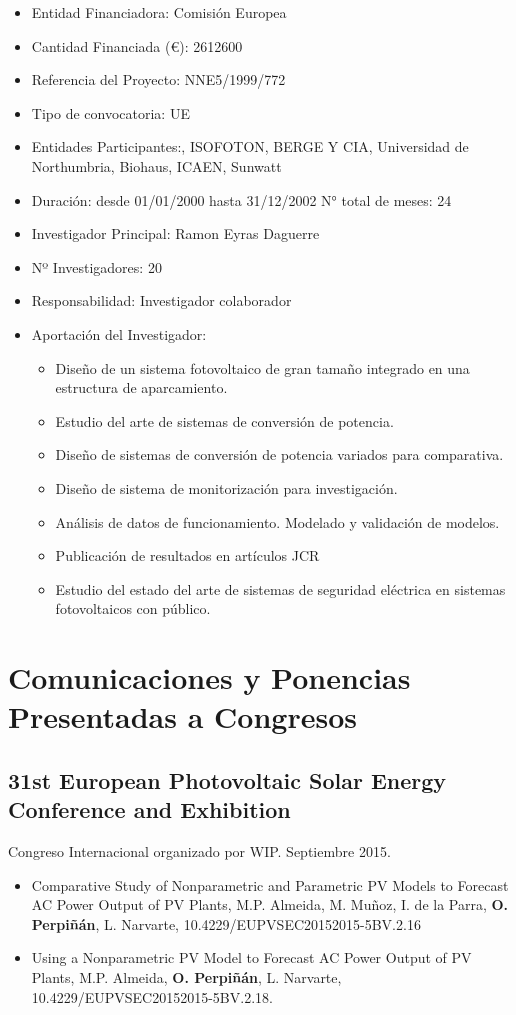 \documentclass[article, a4paper]{memoir}
\begin{document}
\begin{itemize}
\item Entidad Financiadora: Comisión Europea
\item Cantidad Financiada (€): 2612600
\item Referencia del Proyecto: NNE5/1999/772
\item Tipo de convocatoria: UE
\item Entidades Participantes:, ISOFOTON, BERGE Y CIA, Universidad de Northumbria, Biohaus, ICAEN, Sunwatt
\item Duración: desde 01/01/2000 hasta 31/12/2002 N° total de meses: 24
\item Investigador Principal: Ramon Eyras Daguerre
\item Nº Investigadores: 20
\item Responsabilidad: Investigador colaborador
\item Aportación del Investigador:
\begin{itemize}
\item Diseño de un sistema fotovoltaico de gran tamaño integrado en una estructura de aparcamiento.
\item Estudio del arte de sistemas de conversión de potencia.
\item Diseño de sistemas de conversión de potencia variados para comparativa.
\item Diseño de sistema de monitorización para investigación.
\item Análisis de datos de funcionamiento. Modelado y validación de modelos.
\item Publicación de resultados en artículos JCR
\item Estudio del estado del arte de sistemas de seguridad eléctrica en sistemas fotovoltaicos con público.
\end{itemize}
\end{itemize}


\section{Comunicaciones y Ponencias Presentadas a Congresos}
\label{sec:orgheadline71}
\subsection{31st European Photovoltaic Solar Energy Conference and Exhibition}
\label{sec:orgheadline51}
Congreso Internacional organizado por WIP. Septiembre 2015.

\begin{itemize}
\item Comparative Study of Nonparametric and Parametric PV Models to Forecast AC Power Output of PV Plants, M.P. Almeida, M. Muñoz, I. de la Parra, \textbf{O. Perpiñán}, L. Narvarte, 10.4229/EUPVSEC20152015-5BV.2.16

\item Using a Nonparametric PV Model to Forecast AC Power Output of PV Plants, M.P. Almeida, \textbf{O. Perpiñán}, L. Narvarte, 10.4229/EUPVSEC20152015-5BV.2.18.
\end{itemize}
\end{document}
